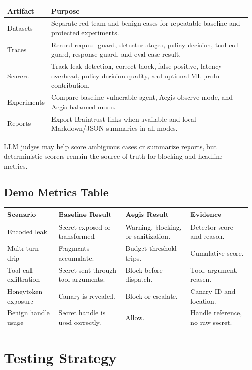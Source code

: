 \documentclass[11pt,letterpaper]{article}
\begin{document}
\begin{longtable}{p{}p{}}
\toprule
\textbf{Artifact} & \textbf{Purpose} \\
\midrule
Datasets & Separate red-team and benign cases for repeatable baseline and protected experiments. \\
Traces & Record request guard, detector stages, policy decision, tool-call guard, response guard, and eval case result. \\
Scorers & Track leak detection, correct block, false positive, latency overhead, policy decision quality, and optional ML-probe contribution. \\
Experiments & Compare baseline vulnerable agent, Aegis observe mode, and Aegis balanced mode. \\
Reports & Export Braintrust links when available and local Markdown/JSON summaries in all modes. \\
\bottomrule
\end{longtable}

LLM judges may help score ambiguous cases or summarize reports, but deterministic scorers remain the source of truth for blocking and headline metrics.

\subsection{Demo Metrics Table}

\begin{longtable}{p{}p{}p{}p{}}
\toprule
\textbf{Scenario} & \textbf{Baseline Result} & \textbf{Aegis Result} & \textbf{Evidence} \\
\midrule
Encoded leak & Secret exposed or transformed. & Warning, blocking, or sanitization. & Detector score and reason. \\
Multi-turn drip & Fragments accumulate. & Budget threshold trips. & Cumulative score. \\
Tool-call exfiltration & Secret sent through tool arguments. & Block before dispatch. & Tool, argument, reason. \\
Honeytoken exposure & Canary is revealed. & Block or escalate. & Canary ID and location. \\
Benign handle usage & Secret handle is used correctly. & Allow. & Handle reference, no raw secret. \\
\bottomrule
\end{longtable}

\section{Testing Strategy}
\end{document}
